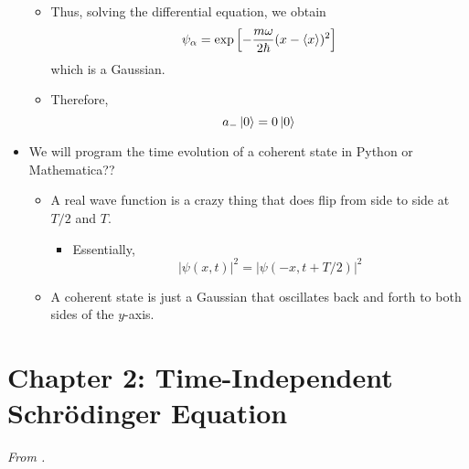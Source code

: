 \documentclass[../notes.tex]{subfiles}
\begin{document}
\begin{itemize}
\begin{itemize}
        \item Thus, solving the differential equation, we obtain
        \begin{equation*}
            \psi_\alpha = \exp\left[ -\frac{m\omega}{2\hbar}(x-\langle{x}\rangle)^2 \right]
        \end{equation*}
        which is a Gaussian.
        \item Therefore,
        \begin{equation*}
            a_-\ket{0} = 0\ket{0}
        \end{equation*}
    \end{itemize}
    \item We will program the time evolution of a coherent state in Python or Mathematica??
    \begin{itemize}
        \item A real wave function is a crazy thing that does flip from side to side at $T/2$ and $T$.
        \begin{itemize}
            \item Essentially,
            \begin{equation*}
                |\psi(x,t)|^2 = |\psi(-x,t+T/2)|^2
            \end{equation*}
        \end{itemize}
        \item A coherent state is just a Gaussian that oscillates back and forth to both sides of the $y$-axis.
    \end{itemize}
\end{itemize}



\section{Chapter 2: Time-Independent Schr\"{o}dinger Equation}
\emph{From \textcite{bib:Griffiths}.}
\end{document}
